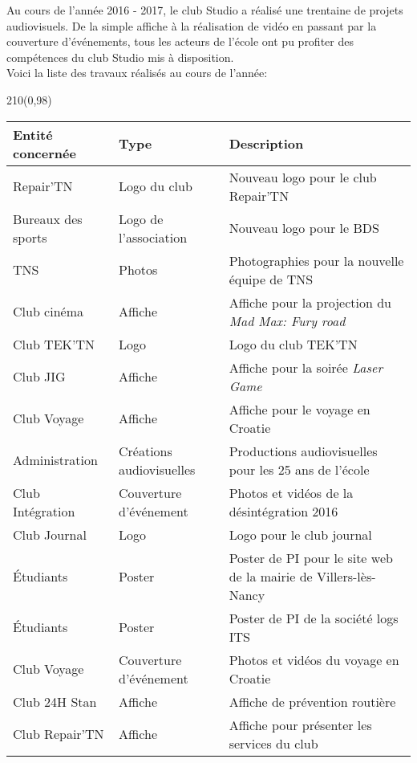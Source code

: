 Au cours de l'année 2016 - 2017, le club Studio a réalisé une trentaine de projets audiovisuels. De la simple affiche à la réalisation de vidéo en passant par la couverture d'événements, tous les acteurs de l'école ont pu profiter des compétences du club Studio mis à disposition.\\

		\noindent Voici la liste des travaux réalisés au cours de l'année:\\

\begin{textblock}{210}(0,98)
\begin{center}
		\noindent\begin{tabular}{|l|l|l|}
	\hline
		\textbf{Entité concernée} & \textbf{Type} & \textbf{Description} \\
	\hline
		Repair’TN 			& Logo du club 				& Nouveau logo pour le club Repair'TN\\
		Bureaux des sports 	& Logo de l'association 	& Nouveau logo pour le BDS\\
		TNS					& Photos 					& Photographies pour la nouvelle équipe de TNS\\
		Club cinéma			& Affiche 					& Affiche pour la projection du \textit{Mad Max: Fury road}\\
		Club TEK’TN			& Logo 						& Logo du club TEK'TN\\
		Club JIG 			& Affiche 					& Affiche pour la soirée \textit{Laser Game}\\
		Club Voyage			& Affiche 					& Affiche pour le voyage en Croatie\\
		Administration 		& Créations audiovisuelles 	& Productions audiovisuelles pour les 25 ans de l’école\\
		Club Intégration 	& Couverture d'événement 	& Photos et vidéos de la désintégration 2016\\
		Club Journal 		& Logo 						& Logo pour le club journal\\
		Étudiants			& Poster 					& Poster de PI pour le site web de la mairie de Villers-lès-Nancy\\
		Étudiants   		& Poster 					& Poster de PI de la  société logs ITS\\
		Club Voyage			& Couverture d'événement	& Photos et vidéos du voyage en Croatie\\
		Club 24H Stan 		& Affiche 					& Affiche de prévention routière\\
		Club Repair'TN 		& Affiche 					& Affiche pour présenter les services du club\\

\end{tabular}
\end{center}
\end{textblock}
